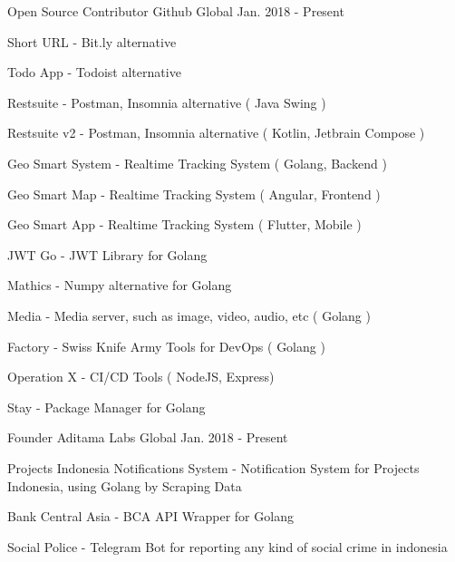 

\begin{cventries}
  \cventry
    {Open Source Contributor} %
    {Github} %
    {Global} %
    {Jan. 2018 - Present} %
    {
      \begin{cvitems} %
        \item {Short URL - Bit.ly alternative}
        \item {Todo App - Todoist alternative}
        \item {Restsuite - Postman, Insomnia alternative ( Java Swing ) }
        \item {Restsuite v2 - Postman, Insomnia alternative ( Kotlin, Jetbrain Compose ) }
        \item {Geo Smart System - Realtime Tracking System ( Golang, Backend ) }
        \item {Geo Smart Map - Realtime Tracking System ( Angular, Frontend ) }
        \item {Geo Smart App - Realtime Tracking System ( Flutter, Mobile ) }
        \item {JWT Go - JWT Library for Golang }
        \item {Mathics - Numpy alternative for Golang }
        \item {Media - Media server, such as image, video, audio, etc ( Golang ) }
        \item {Factory - Swiss Knife Army Tools for DevOps ( Golang ) }
        \item {Operation X - CI/CD Tools ( NodeJS, Express) }
        \item {Stay - Package Manager for Golang }
      \end{cvitems}
    }
  \cventry
  {Founder} %
  {Aditama Labs} %
  {Global} %
  {Jan. 2018 - Present} %
  {
    \begin{cvitems} %
      \item {Projects Indonesia Notifications System - Notification System for Projects Indonesia, using Golang by Scraping Data }
      \item {Bank Central Asia - BCA API Wrapper for Golang }
      \item {Social Police - Telegram Bot for reporting any kind of social crime in indonesia }
    \end{cvitems}
  }


\end{cventries}

